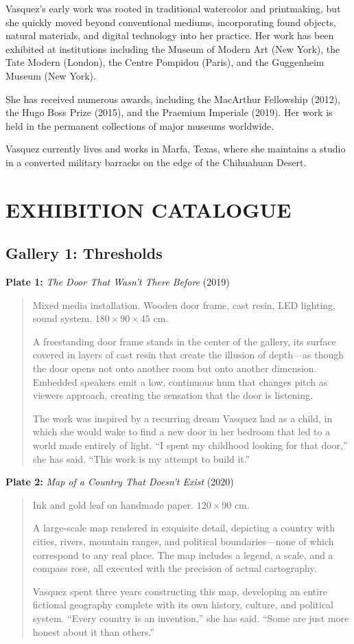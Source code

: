 \documentclass[
    language=english,
    doctype=art-catalogue,
    institution=none,
]{../../omnilatex}
\begin{document}
Vasquez's early work was rooted in traditional watercolor and printmaking, but she quickly moved beyond conventional mediums, incorporating found objects, natural materials, and digital technology into her practice. Her work has been exhibited at institutions including the Museum of Modern Art (New York), the Tate Modern (London), the Centre Pompidou (Paris), and the Guggenheim Museum (New York).

She has received numerous awards, including the MacArthur Fellowship (2012), the Hugo Boss Prize (2015), and the Praemium Imperiale (2019). Her work is held in the permanent collections of major museums worldwide.

Vasquez currently lives and works in Marfa, Texas, where she maintains a studio in a converted military barracks on the edge of the Chihuahuan Desert.

\section*{EXHIBITION CATALOGUE}

\subsection{Gallery 1: Thresholds}

\textbf{Plate 1:} \textit{The Door That Wasn't There Before} (2019)
\begin{quote}
Mixed media installation. Wooden door frame, cast resin, LED lighting, sound system.
$180 \times 90 \times 45$ cm.

A freestanding door frame stands in the center of the gallery, its surface covered in layers of cast resin that create the illusion of depth---as though the door opens not onto another room but onto another dimension. Embedded speakers emit a low, continuous hum that changes pitch as viewers approach, creating the sensation that the door is listening.

The work was inspired by a recurring dream Vasquez had as a child, in which she would wake to find a new door in her bedroom that led to a world made entirely of light. ``I spent my childhood looking for that door,'' she has said. ``This work is my attempt to build it.''
\end{quote}

\textbf{Plate 2:} \textit{Map of a Country That Doesn't Exist} (2020)
\begin{quote}
Ink and gold leaf on handmade paper.
$120 \times 90$ cm.

A large-scale map rendered in exquisite detail, depicting a country with cities, rivers, mountain ranges, and political boundaries---none of which correspond to any real place. The map includes a legend, a scale, and a compass rose, all executed with the precision of actual cartography.

Vasquez spent three years constructing this map, developing an entire fictional geography complete with its own history, culture, and political system. ``Every country is an invention,'' she has said. ``Some are just more honest about it than others.''
\end{quote}
\end{document}
